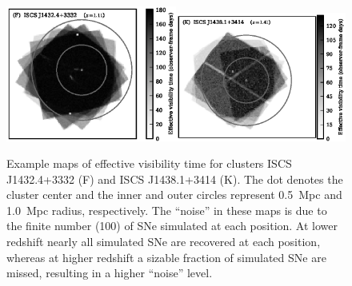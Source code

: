 \begin{figure}

\includegraphics[width=0.5\textwidth]{figures/clrate/ctmap_f.eps}\includegraphics[width=0.5\textwidth]{figures/clrate/ctmap_k.eps}
\caption[Example maps of effective visibility times]
{Example maps of effective visibility time for clusters 
ISCS J1432.4+3332 (F) and ISCS J1438.1+3414 (K).  The dot denotes the
cluster center and the inner and outer circles represent 0.5~Mpc and
1.0~Mpc radius, respectively. The ``noise'' in these maps is due to
the finite number (100) of SNe simulated at each position.  At lower
redshift nearly all simulated SNe are recovered at each position,
whereas at higher redshift a sizable fraction of simulated SNe are
missed, resulting in a higher ``noise'' level.
\label{fig:ctmaps}}
\end{figure}
